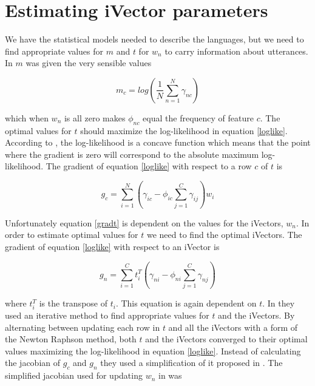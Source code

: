 \section{Estimating iVector parameters}
\label{itrain}

We have the statistical models needed to describe the languages, but we need to find appropriate values for $m$ and $t$ for $w_n$ to carry information about utterances. In \cite{liiVector} $m$ was given the very sensible values

\begin{equation}\label{optm}
m_c=log\left(\frac{1}{N}\sum_{n=1}^{N}\gamma_{nc}\right)
\end{equation}

which when $w_n$ is all zero makes $\phi_{nc}$ equal the frequency of feature $c$. The optimal values for $t$ should maximize the log-likelihood in equation \ref{loglike}. According to \cite{liiVector}, the log-likelihood is a concave function which means that the point where the gradient is zero will correspond to the absolute maximum log-likelihood. The gradient of equation \ref{loglike} with respect to a row $c$ of $t$ is

\begin{equation}\label{gradt}
g_c=\sum_{i=1}^N(\gamma_{ic}-\phi_{ic}\sum_{j=1}^{C}\gamma_{ij})w_i
\end{equation}

Unfortunately equation \ref{gradt} is dependent on the values for the iVectors, $w_n$. In order to estimate optimal values for $t$ we need to find the optimal iVectors. The gradient of equation \ref{loglike} with respect to an iVector is

\begin{equation}\label{gradw}
g_n=\sum_{i=1}^Ct_i^T(\gamma_{ni}-\phi_{ni}\sum_{j=1}^C \gamma_{nj})
\end{equation}

where $t_i^T$ is the transpose of $t_i$. This equation is again dependent on $t$. In \cite{sviVector} they used an iterative method to find appropriate values for $t$ and the iVectors. By alternating between updating each row in $t$ and all the iVectors with a form of the Newton Raphson method, both $t$ and the iVectors converged to their optimal values maximizing the log-likelihood in equation \ref{loglike}. Instead of calculating the jacobian of $g_c$ and $g_n$ they used a simplification of it proposed in \cite{jacobian}. The simplified jacobian used for updating $w_n$ in \cite{sviVector} was

